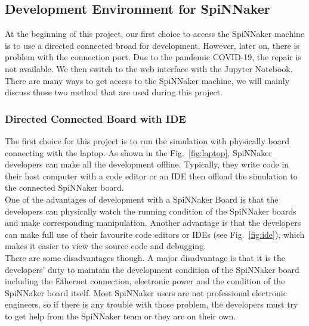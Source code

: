 \subsection{Development Environment for SpiNNaker} \label{sec:impl}
At the beginning of this project, our first choice to access the SpiNNaker machine is to use a directed connected broad for development. However, later on, there is problem with the connection port. Due to the pandemic COVID-19, the repair is not available. We then switch to the web interface with the Jupyter Notebook. There are many ways to get access to the SpiNNaker machine, we will mainly discuss those two method that are used during this project.
\subsubsection{Directed Connected Board with IDE}
The first choice for this project is to run the simulation with physically board connecting with the laptop. As shown in the Fig.~\ref{fig:laptop}, SpiNNaker developers can make all the development offline. Typically, they write code in their host computer with a code editor or an IDE then offload the simulation to the connected SpiNNaker board.\\

One of the advantages of development with a SpiNNaker Board is that the developers can physically watch the running condition of the SpiNNaker boards and make corresponding manipulation. Another advantage is that the developers can make full use of their favourite code editors or IDEs (see Fig.~\ref{fig:ide}), which makes it easier to view the source code and debugging.\\

There are some disadvantages though. A major disadvantage is that it is the developers' duty to maintain the development condition of the SpiNNaker board including the Ethernet connection, electronic power and the condition of the SpiNNaker board itself. Most SpiNNaker users are not professional electronic engineers, so if there is any trouble with those problem, the developers must try to get help from the SpiNNaker team or they are on their own. \\

